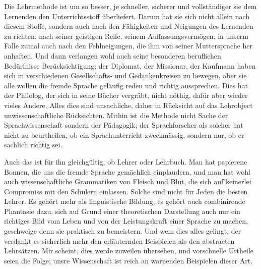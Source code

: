 Die Lehrmethode ist um so besser, je schneller, sicherer und vollständiger sie dem Lernenden den Unterrichtsstoff überliefert. Darum hat sie sich nicht allein nach diesem Stoffe, sondern auch nach den Fähigkeiten und Neigungen des Lernenden zu richten, nach seiner geistigen Reife, seinem Auffassungsvermögen, in unserm Falle zumal auch nach den Fehlneigungen, die ihm von seiner Muttersprache her anhaften. Und dann verlangen wohl auch seine besonderen beruflichen Bedürfnisse Berücksichtigung; der Diplomat, der Missionar, der Kaufmann haben sich in verschiedenen Gesellschafts- und Gedankenkreisen zu bewegen, aber sie alle wollen die fremde Sprache geläufig reden und richtig aussprechen. Dies hat der Philolog, der sich in seine Bücher vergräbt, nicht nöthig, dafür aber wieder vieles Andere. Alles dies sind unsachliche, daher in Rücksicht auf das Lehrobject unwissenschaftliche Rücksichten. Mithin ist die Methode nicht Sache der Sprachwissenschaft sondern der Pädagogik; der Sprachforscher als solcher hat nicht zu beurtheilen, ob ein Sprachunterricht zweckmässig, sondern nur, ob er sachlich richtig sei.

\largerpage[1]Auch das ist für ihn gleichgültig, ob Lehrer oder Lehrbuch. Man hat papierene Bonnen, die uns die fremde Sprache gemächlich einplaudern, und man hat wohl auch wissenschaftliche Grammatiken von Fleisch und Blut, die sich auf keinerlei Compromiss mit den Schülern einlassen. Solche sind nicht für Jeden die besten Lehrer. Es gehört mehr als \label{fp.73} linguistische Bildung, es gehört auch combinirende Phantasie dazu, sich auf Grund einer theoretischen Darstellung auch nur ein richtiges Bild vom Leben und von der Leistungskraft einer Sprache zu machen, geschweige denn sie praktisch zu bemeistern. Und wem dies alles gelingt, der verdankt es sicherlich mehr den erläuternden Beispielen als den abstracten Lehrsätzen. Mir scheint, dies werde zuweilen übersehen, und vorschnelle Urtheile seien die Folge; unsre Wissenschaft ist reich an warnenden Beispielen dieser Art.

